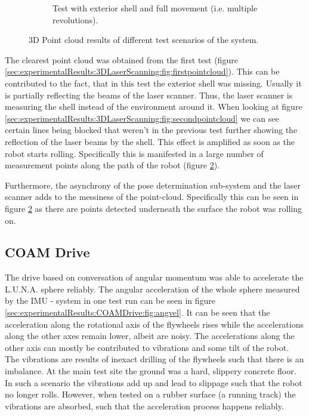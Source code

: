 \begin{figure}
\begin{subfigure}[b]{\textwidth}
	\caption{Test with exterior shell and full movement (i.e. multiple revolutions).}
	\label{sec:experimentalResults:3DLaserScanning:fig:thirdpointcloud}
\end{subfigure}
\caption{3D Point cloud results of different test scenarios of the system.}
\end{figure}

The clearest point cloud was obtained from the first test (figure \ref{sec:experimentalResults:3DLaserScanning:fig:firstpointcloud}). This can be contributed to the fact, that in this test the exterior shell was missing. Usually it is partially reflecting the beams of the laser scanner. Thus, the laser scanner is measuring the shell instead of the environment around it. When looking at figure \ref{sec:experimentalResults:3DLaserScanning:fig:secondpointcloud} we can see certain lines being blocked that weren't in the previous test further showing the reflection of the laser beams by the shell. This effect is amplified as soon as the robot starts rolling. Specifically this is manifested in a large number of measurement points along the path of the robot (figure \ref{sec:experimentalResults:3DLaserScanning:fig:thirdpointcloud}).

Furthermore, the asynchrony of the pose determination sub-system and the laser scanner adds to the messiness of the point-cloud. Specifically this can be seen in figure \ref{sec:experimentalResults:3DLaserScanning:fig:thirdpointcloud} as there are points detected underneath the surface the robot was rolling on. 

\subsection{COAM Drive}
\label{sec:experimentalResults:COAMDrive}

The drive based on conversation of angular momentum was able to accelerate the L.U.N.A. sphere reliably. The angular acceleration of the whole sphere measured by the IMU - system in one test run can be seen in figure \ref{sec:experimentalResults:COAMDrive:fig:angvel}. It can be seen that the acceleration along the rotational axis of the flywheels rises while the accelerations along the other axes remain lower, albeit are noisy. The accelerations along the other axis can mostly be contributed to vibrations and some tilt of the robot. The vibrations are results of inexact drilling of the flywheels such that there is an imbalance. At the main test site the ground was a hard, slippery concrete floor. In such a scenario the vibrations add up and lead to slippage such that the robot no longer rolls. However, when tested on a rubber surface (a running track) the vibrations are absorbed, such that the acceleration process happens reliably.

